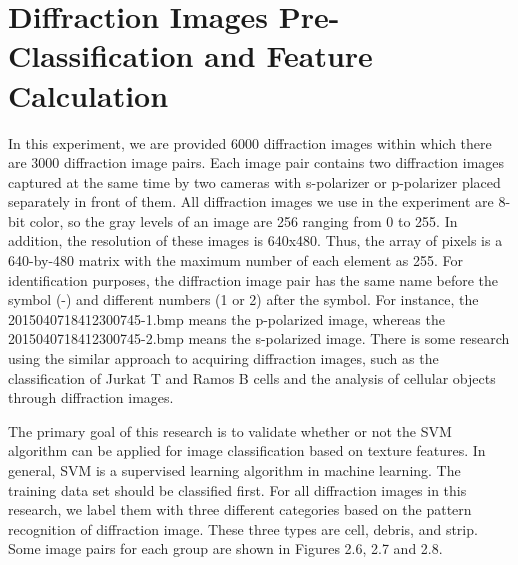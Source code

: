 \section{Diffraction Images Pre-Classification and Feature Calculation}
In this experiment, we are provided 6000 diffraction images within which there are 3000 diffraction image pairs. Each image pair contains two diffraction images captured at the same time by two cameras with s-polarizer or p-polarizer placed separately in front of them. All diffraction images we use in the experiment are 8-bit color, so the gray levels of an image are 256 ranging from 0 to 255. In addition, the resolution of these images is 640x480. Thus, the array of pixels is a 640-by-480 matrix with the maximum number of each element as 255. For identification purposes, the diffraction image pair has the same name before the symbol (-) and different numbers (1 or 2) after the symbol. For instance, the 2015040718412300745-1.bmp means the p-polarized image, whereas the 2015040718412300745-2.bmp means the s-polarized image. There is some research using the similar approach to acquiring diffraction images, such as the classification of Jurkat T and Ramos B cells\cite{Feng} and the analysis of cellular objects through diffraction images\cite{Zhang}. \par
The primary goal of this research is to validate whether or not the SVM algorithm can be applied for image classification based on texture features. In general, SVM is a supervised learning algorithm in machine learning. The training data set should be classified first. For all diffraction images in this research, we label them with three different categories based on the pattern recognition of diffraction image. These three types are cell, debris, and strip. Some image pairs for each group are shown in Figures 2.6, 2.7 and 2.8. 
